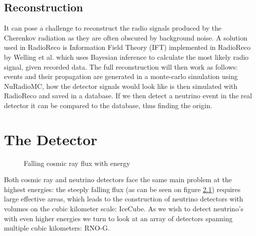 \documentclass[11pt,a4paper,faculty=we,language=en,doctype=report]{cls/ugent-doc}
\begin{document}
\section{Reconstruction}
It can pose a challenge to reconstruct the radio signals produced by the
Cherenkov radiation as they are often obscured by background noise. A solution
used in RadioReco is Information Field Theory (IFT) implemented in RadioReco by
Welling et al.\cite{Welling_2021} which uses Bayesian inference to calculate
the most likely radio signal, given recorded data.
The full reconstruction will then work as follows: events and their propagation
are generated in a monte-carlo simulation
using NuRadioMC\cite{Glaser_2019}\cite{Glaser_2020}, how the detector signals would look 
like is then simulated with RadioReco and saved in a database. 
If we then detect a neutrino event in the real detector it can
be compared to the database, thus finding the origin.
\chapter{The Detector}
\begin{figure}
	\centering
	\caption{Falling cosmic ray flux with energy}
	\label{figure:FallingFlux}
\end{figure}
Both cosmic ray and neutrino detectors face the same main problem at the
highest energies: the steeply falling flux (as can be seen on figure \ref{figure:FallingFlux}) 
requires large effective areas, which
leads to the construction of neutrino detectors with volumes on the cubic
kilometer scale: IceCube. As we wish to detect neutrino's with even higher
energies we turn to look at an array of detectors spanning multiple cubic
kilometers: RNO-G.
\end{document}
